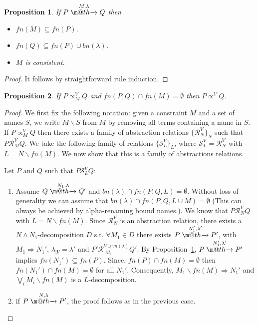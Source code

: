 \documentclass[submission,copyright,creativecommons]{eptcs}
\makeatletter
\newcommand{\fn}{\mathit{fn}}
\newcommand{\bn}{\mathit{bn}}
\newcommand{\vn}{\mathit{vn}}
\newcommand{\act}{\lambda}
\newcommand{\tr}[1]{\stackrel{#1}{\rightarrowfill}}
\def \rightarrowfill{\m@th\mathord{\smash-}\mkern-6mu\cleaders\hbox{$\mkern-2mu\mathord{\smash-}\mkern-2mu$}\hfill
  \mkern-6mu\mathord\rightarrow}
\newtheorem{proposition}{Proposition}
\makeatother
\begin{document}
\begin{proposition} 
\label{prop:fninreductions}If $P\tr{M,\lambda} Q$ then 
\begin{itemize}
   \item $\fn(M) \subseteq \fn(P)$.
   \item $\fn(Q) \subseteq \fn(P)\cup\bn(\lambda)$.
   \item $M$ is consistent.

\end{itemize}
\end{proposition}

\begin{proof} It follows by straightforward rule induction.
\end{proof}


\begin{proposition} 
\label{prop:condition-cut}
If $P\propto^V_M Q$ and $\fn(P,Q) \cap \fn(M) = \emptyset$ then
$P \propto^V Q$.
\end{proposition}

\begin{proof}  We first fix the following notation: given a constraint $M$ and a set of 
names $S$, we write $M\backslash S$ from $M$ by removing all terms containing a name in $S$.
If $P\propto^V_M Q$ then there exists a family of abstraction relations 
$\{\mathcal{R}^V_N\}_N$ such that $P \mathcal{R}^V_M Q$.
We take the following family of relations $\{\mathcal{S}^V_L\}_L$, where 
$\mathcal{S}^V_L = \mathcal{R}^V_N$ with $L= N\backslash\fn(M)$. We now show that this is 
a family of abstractions relations. 

Let $P$ and $Q$ such that $P\mathcal{S}^V_L Q$:

 \begin{enumerate}
 \item Assume $Q \tr {N_1, \act} Q'$ and $\bn(\act)\cap\fn(P,Q,L) =\emptyset$. Without loss of 
 generality we can
 assume that $\bn(\act)\cap\fn(P,Q,L\cup M) = \emptyset$ (This can always be  
 achieved by alpha-renaming bound names.). We know that $P\mathcal{R}^V_N Q$ with
 $L = N\backslash\fn(M)$. Since $\mathcal{R}^V_N$ is an abstraction relation, 
 there exists a $N\wedge N_1$-decomposition $D$ s.t. $\forall M_1\in D$ there exists $P \tr {N_1',\act'} P'$, with
   $M_1\Rightarrow N_1'$, $\act_{|V} = \act'$ 
   and $P' \mathcal{R}^{V \cup \vn(\act) }_{\;M_1} Q'$. By Proposition~\ref{prop:fninreductions},
   $P \tr {N_1',\act'} P'$ implies $\fn(N_1') \subseteq \fn(P)$. Since, $\fn(P)\cap\fn(M) = \emptyset$ then $\fn(N_1')\cap \fn(M) = \emptyset$ for all $N_1'$. Consequently, $M_1\backslash\fn(M) \Rightarrow N_1'$ and $\bigvee_i M_i\backslash\fn(M)$ is a $L$-decomposition.
   
 \item if $P \tr {N, \act} P'$, the proof follows as in the previous case. 
\end{enumerate}
\end{proof}
\end{document}

